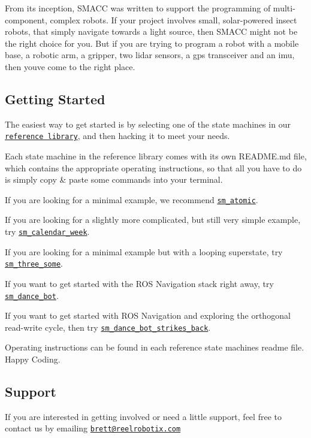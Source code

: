 From it\textquotesingle{}s inception, S\+M\+A\+CC was written to support the programming of multi-\/component, complex robots. If your project involves small, solar-\/powered insect robots, that simply navigate towards a light source, then S\+M\+A\+CC might not be the right choice for you. But if you are trying to program a robot with a mobile base, a robotic arm, a gripper, two lidar sensors, a gps transceiver and an imu, then you\textquotesingle{}ve come to the right place.

 

\subsection*{Getting Started}

The easiest way to get started is by selecting one of the state machines in our \href{https://github.com/reelrbtx/SMACC/tree/master/smacc_sm_reference_library}{\tt reference library}, and then hacking it to meet your needs.

Each state machine in the reference library comes with it\textquotesingle{}s own R\+E\+A\+D\+M\+E.\+md file, which contains the appropriate operating instructions, so that all you have to do is simply copy \& paste some commands into your terminal.


\begin{DoxyItemize}
\item If you are looking for a minimal example, we recommend \href{https://github.com/reelrbtx/SMACC/tree/master/smacc_sm_reference_library/sm_atomic}{\tt sm\+\_\+atomic}.
\item If you are looking for a slightly more complicated, but still very simple example, try \href{https://github.com/reelrbtx/SMACC/tree/master/smacc_sm_reference_library/sm_calendar_week}{\tt sm\+\_\+calendar\+\_\+week}.
\item If you are looking for a minimal example but with a looping superstate, try \href{https://github.com/reelrbtx/SMACC/tree/master/smacc_sm_reference_library/sm_three_some}{\tt sm\+\_\+three\+\_\+some}.
\item If you want to get started with the R\+OS Navigation stack right away, try \href{https://github.com/reelrbtx/SMACC/tree/master/smacc_sm_reference_library/sm_dance_bot}{\tt sm\+\_\+dance\+\_\+bot}.
\item If you want to get started with R\+OS Navigation and exploring the orthogonal read-\/write cycle, then try \href{https://github.com/reelrbtx/SMACC/tree/master/smacc_sm_reference_library/sm_dance_bot_strikes_back}{\tt sm\+\_\+dance\+\_\+bot\+\_\+strikes\+\_\+back}.
\end{DoxyItemize}

Operating instructions can be found in each reference state machines readme file. Happy Coding.

\subsection*{Support}

If you are interested in getting involved or need a little support, feel free to contact us by emailing \href{mailto:brett@reelrobotix.com}{\tt brett@reelrobotix.\+com} 